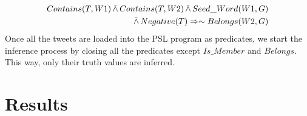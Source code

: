 \begin{align*}
\begin{split}
Contains(T,W1) 
	\softand Contains(T,W2)
	\softand Seed\_Word(W1,G)\\ 
	\softand Negative(T)
	\Rightarrow \sim Belongs(W2,G)
\end{split}
\end{align*}
Once all the tweets are loaded into the PSL program as predicates, we start the inference process by closing all the predicates except $Is\_Member$ and $Belongs$. 
This way, only their truth values are inferred.
\section{Results}
\begin{figure}
	\centering
	 \\
	\noindent 
\end{figure}
